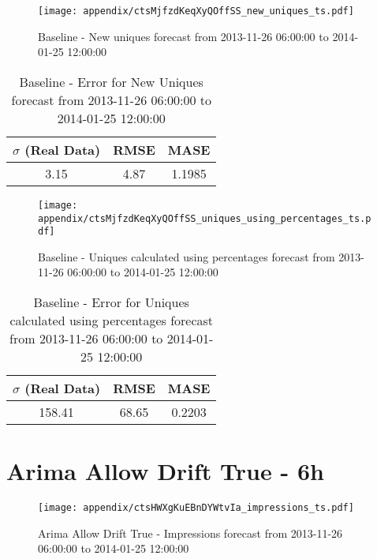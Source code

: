 \begin{figure}[H] \begin{center} \leavevmode
\texttt{[image: appendix/ctsMjfzdKeqXyQOffSS\_new\_uniques\_ts.pdf]} \caption[]{
Baseline - New uniques forecast from 2013-11-26 06:00:00 to 2014-01-25 12:00:00} \label{fig:appendix/ctsMjfzdKeqXyQOffSS_new_uniques_ts.pdf} \end{center}
\end{figure}

\begin{table}[H]
\centering
\footnotesize
\begin{tabular}{ccc}
$\sigma$ (Real Data) & RMSE & MASE   \\ \hline
3.15 & 4.87 & 1.1985 \\
\end{tabular}

\vspace{0.5cm}

\caption[]{
Baseline - Error for New Uniques forecast from 2013-11-26 06:00:00 to 2014-01-25 12:00:00}
\end{table}

\begin{figure}[H] \begin{center} \leavevmode
\texttt{[image: appendix/ctsMjfzdKeqXyQOffSS\_uniques\_using\_percentages\_ts.pdf]} \caption[]{
Baseline - Uniques calculated using percentages forecast from 2013-11-26 06:00:00 to 2014-01-25 12:00:00} \label{fig:appendix/ctsMjfzdKeqXyQOffSS_uniques_using_percentages_ts.pdf} \end{center}
\end{figure}

\begin{table}[H]
\centering
\footnotesize
\begin{tabular}{ccc}
$\sigma$ (Real Data) & RMSE & MASE   \\ \hline
158.41 & 68.65 & 0.2203 \\
\end{tabular}

\vspace{0.5cm}

\caption[]{
Baseline - Error for Uniques calculated using percentages forecast from 2013-11-26 06:00:00 to 2014-01-25 12:00:00}
\end{table}

\section{Arima Allow Drift True - 6h}
\begin{figure}[H] \begin{center} \leavevmode
\texttt{[image: appendix/ctsHWXgKuEBnDYWtvIa\_impressions\_ts.pdf]} \caption[]{
Arima Allow Drift True - Impressions forecast from 2013-11-26 06:00:00 to 2014-01-25 12:00:00} \label{fig:appendix/ctsHWXgKuEBnDYWtvIa_impressions_ts.pdf} \end{center}
\end{figure}

